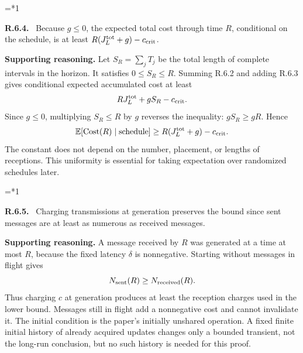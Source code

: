 \documentclass[12pt,letterpaper]{article}
\newcommand{\E}{\mathbb E}
\newenvironment{proofstep}[2]{%
  \begin{list}{}{\leftmargin=\dimexpr 0.17in*#2\relax%
  \setlength{\rightmargin}{0pt}\setlength{\topsep}{5pt}\setlength{\parsep}{2pt}}%
  \item[]\textbf{\textcolor{ink}{#1.}}\ }{\end{list}}
\begin{document}
\begin{proofstep}{R.6.4}{1}
\label{step:R.6.4}
Because $g\le0$, the expected total cost through time $R$, conditional on the schedule, is at least $R(J_L^{\rm tot}+g)-c_{\rm crit}$.

\textbf{Supporting reasoning.}
Let $S_R=\sum_jT_j$ be the total length of complete intervals in the horizon. It satisfies $0\le S_R\le R$. Summing R.6.2 and adding R.6.3 gives conditional expected accumulated cost at least
\[
RJ_L^{\rm tot}+gS_R-c_{\rm crit}.
\]
Since $g\le0$, multiplying $S_R\le R$ by $g$ reverses the inequality: $gS_R\ge gR$. Hence
\[
\E[\mathrm{Cost}(R)\mid\mathrm{schedule}]
\ge R(J_L^{\rm tot}+g)-c_{\rm crit}.
\]
The constant does not depend on the number, placement, or lengths of receptions. This uniformity is essential for taking expectation over randomized schedules later.
\par{}
\end{proofstep}

\begin{proofstep}{R.6.5}{1}
\label{step:R.6.5}
Charging transmissions at generation preserves the bound since sent messages are at least as numerous as received messages.

\textbf{Supporting reasoning.}
A message received by $R$ was generated at a time at most $R$, because the fixed latency $\delta$ is nonnegative. Starting without messages in flight gives
\[
N_{\rm sent}(R)\ge N_{\rm received}(R).
\]
Thus charging $c$ at generation produces at least the reception charges used in the lower bound. Messages still in flight add a nonnegative cost and cannot invalidate it. The initial condition is the paper's initially unshared operation. A fixed finite initial history of already acquired updates changes only a bounded transient, not the long-run conclusion, but no such history is needed for this proof.
\par{}
\end{proofstep}
\end{document}
